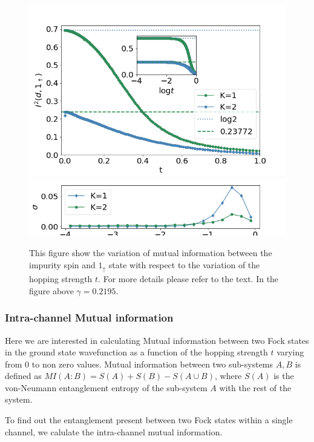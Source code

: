 \documentclass[reprint,prb,superscriptaddress]{revtex4-2}
\begin{document}
\begin{figure}[!htpb]
\includegraphics[scale=0.40]{plt/A_I2_ch12_['d','1_up']}
\includegraphics[scale=0.40]{plt/errorbar_A_I2_ch12_['d','1_up']}
\caption{This figure show the variation of mutual information between the impurity spin and $1_{\uparrow}$ state with respect to the variation of the hopping strength $t$. For more details please refer to the text. In the figure above $\gamma=0.2195$.}
\label{fig:MI_imp_1_vs_t_K}
\end{figure}

\subsubsection{Intra-channel Mutual information}

\noindent Here we are interested in calculating Mutual information between two Fock states in the ground state wavefunction as a function of the hopping strength $t$ varying from $0$ to non zero values. Mutual information between two sub-systems $A,B$ is defined as $MI(A:B)=S(A)+S(B)-S(A\cup B)$, where $S(A)$ is the von-Neumann entanglement entropy of the sub-system $A$ with the rest of the system. 

\noindent To find out the entanglement present between two Fock states within a single channel, we calulate the intra-channel mutual information.
\end{document}
